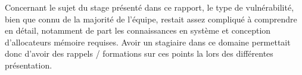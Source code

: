 Concernant le sujet du stage présenté dans ce rapport, le type de vulnérabilité, bien que connu de la majorité de l'équipe, restait assez compliqué à comprendre en détail, notamment de part les connaissances en système et conception d'allocateurs mémoire requises. Avoir un stagiaire dans ce domaine permettait donc d'avoir des rappels / formations sur ces points la lors des différentes présentation.


\paragraph{}
\subparagraph{}
\newpage
